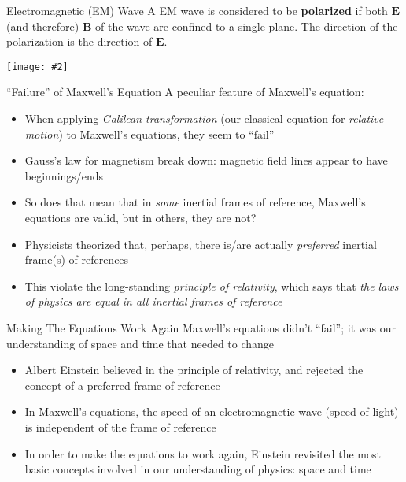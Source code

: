 \documentclass[12pt,aspectratio=169]{beamer}
\newcommand{\pic}[2]{\texttt{[image: \#2]}}
\begin{document}
\begin{frame}{Electromagnetic (EM) Wave}
  A EM wave is considered to be \textbf{polarized} if both $\bm{E}$
  (and therefore) $\bm{B}$ of the wave are confined to a single plane. The
  direction of the polarization is the direction of $\bm{E}$.
  \begin{center}
    \pic{.4}{em-20field}
  \end{center}
\end{frame}



\begin{frame}{``Failure'' of Maxwell's Equation}
  A peculiar feature of Maxwell's equation:
  \begin{itemize}
  \item When applying \emph{Galilean transformation} (our classical equation for
    \emph{relative motion}) to Maxwell's equations, they seem to ``fail''
  \item Gauss's law for magnetism break down: magnetic field lines appear to
    have beginnings/ends
  \item So does that mean that in \emph{some} inertial frames of reference,
    Maxwell's equations are valid, but in others, they are not?
  \item Physicists theorized that, perhaps, there is/are actually
    \emph{preferred} inertial frame(s) of references
  \item This violate the long-standing
    \emph{principle of relativity}, which says that
    \emph{the laws of physics are equal in all inertial frames of reference}
  \end{itemize}
\end{frame}



\begin{frame}{Making The Equations Work Again}
  Maxwell's equations didn't ``fail''; it was our understanding of space and
  time that needed to change
  \begin{itemize}
  \item Albert Einstein believed in the principle of relativity, and rejected
    the concept of a preferred frame of reference
  \item In Maxwell's equations, the speed of an electromagnetic wave (speed of
    light) is independent of the frame of reference
  \item In order to make the equations to work again, Einstein revisited the
    most basic concepts involved in our understanding of physics: space and
    time
  \end{itemize}
\end{frame}
\end{document}
